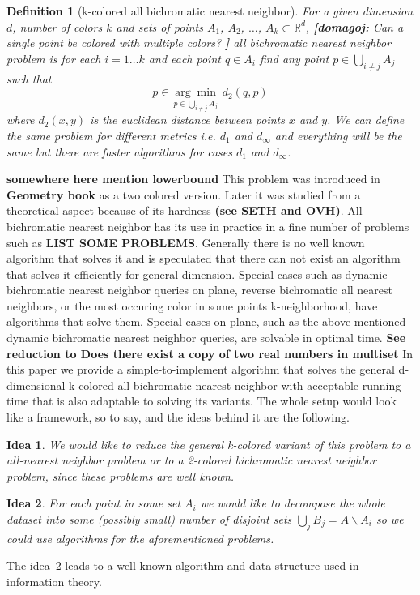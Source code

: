 \documentclass{article}
\newcommand\todo[1]{{\bf \textcolor{bordeaux}{#1}}}
\newtheorem{definition}{Definition}
\newtheorem{idea}{Idea}
\newcommand{\nota}[3]{{%
		\color{#2}
		\marginpar{\color{#2!75!black}\textbf\texttimes}%
		\textsf{\textbf{[\textbullet#1:}
			\textsf{\small#3}
			\textbf{\textbullet]}}%
}}
\newcommand{\domagoj}[1]{\nota{domagoj}{red!55!black}{#1}}
\begin{document}
\begin{definition}[k-colored all bichromatic nearest neighbor]
For a given dimension $d$, number of colors $k$ and sets of points $A_1$, $A_2$, $\dots$, $A_k \subset \mathbb{R}^d$, \domagoj{Can a single point be colored with multiple colors?}{\it all bichromatic nearest neighbor} problem is for each $i = 1 \dots k$ and each point $q \in A_i$ find any point $ p \in \bigcup \limits_{i \neq j} A_j$ such that
$$
	p \in \underset{{p \in \bigcup \limits_{i \neq j} A_j}}{\arg \min }\;  d_2 \left(q, p\right)
$$
where $d_2(x,y)$ is the euclidean distance between points $x$ and $y$. We can define the same problem for different metrics i.e. $d_1$ and $d_\infty$ and everything will be the same but
there are faster algorithms for cases $d_1$ and $d_\infty$.
\end{definition}
\todo{somewhere here mention lowerbound}
This problem was introduced in \todo{Geometry book} as a two colored version.
Later it was studied from a theoretical aspect because of its hardness \todo{(see SETH and OVH)}.
All bichromatic nearest neighbor has its use in practice in a fine number of problems such as \todo{LIST SOME PROBLEMS}.
Generally there is no well known algorithm that solves it and is speculated that there can not exist an algorithm that solves it efficiently for general dimension.
Special cases such as dynamic bichromatic nearest neighbor queries on plane, reverse bichromatic all nearest neighbors, or the most occuring color in some points k-neighborhood, have algorithms that solve them.
Special cases on plane, such as the above mentioned dynamic bichromatic nearest neighbor queries, are solvable in optimal time. \todo{See reduction to Does there exist a copy of two real numbers in multiset}
In this paper we provide a simple-to-implement algorithm that solves the general d-dimensional k-colored all bichromatic nearest neighbor with acceptable running time that is also adaptable to solving its variants.
The whole setup would look like a framework, so to say, and the ideas behind it are the following.
\begin{idea} We would like to reduce the general k-colored variant of this problem to a all-nearest neighbor problem or to a 2-colored bichromatic nearest neighbor problem, since these problems are well known.
\end{idea}
\begin{idea}\label{idea:bigcup} For each point in some set $A_i$ we would like to decompose the whole dataset into some (possibly small) number of disjoint sets $\bigcup\limits_j B_j = A \backslash A_i$ so we could use algorithms for the aforementioned problems.
\end{idea}
The idea~\ref{idea:bigcup} leads to a well known algorithm and data structure used in information theory.
\end{document}
